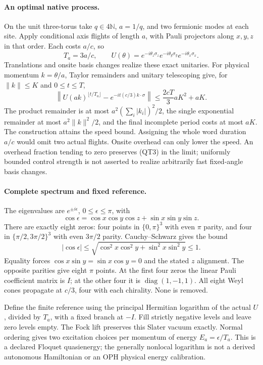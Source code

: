 \paragraph{An optimal native process.}
On the unit three-torus take $q\in4\mathbb N$, $a=1/q$, and two fermionic
modes at each site. Apply conditional axis flights of length $a$, with
Pauli projectors along $x,y,z$ in that order. Each costs $a/c$, so
\[
 T_a=3a/c,\qquad
 U(\theta)=e^{-i\theta_z\sigma_z}e^{-i\theta_y\sigma_y}
               e^{-i\theta_x\sigma_x}.
 \tag{QT2}
\]
Translations and onsite basis changes realize these exact unitaries.
For physical momentum $k=\theta/a$, Taylor remainders and unitary
telescoping give, for $\|k\|\leq K$ and $0\leq t\leq T$,
\[
 \left\|U(ak)^{\lfloor t/T_a\rfloor}
       -e^{-it(c/3)k\cdot\sigma}\right\|
 \leq \frac{2cT}{3}aK^2+aK.
 \tag{QT3}
\]
The product remainder is at most $a^2(\sum_i|k_i|)^2/2$, the single
exponential remainder at most $a^2\|k\|^2/2$, and the final incomplete
period costs at most $aK$. The construction attains the speed bound.
Assigning the whole word duration $a/c$ would omit two actual flights.
Onsite overhead can only lower the speed. An overhead fraction tending to
zero preserves (QT3) in the limit; uniformly bounded control strength is
not asserted to realize arbitrarily fast fixed-angle basis changes.

\paragraph{Complete spectrum and fixed reference.}
The eigenvalues are $e^{\pm i\epsilon}$, $0\leq\epsilon\leq\pi$, with
\[
 \cos\epsilon=\cos x\cos y\cos z+\sin x\sin y\sin z.
 \tag{QT4}
\]
There are exactly eight zeros: four points in $\{0,\pi\}^3$ with even
$\pi$ parity, and four in $\{\pi/2,3\pi/2\}^3$ with even $3\pi/2$
parity. Cauchy--Schwarz gives the bound
\[
 |\cos\epsilon|\leq\sqrt{\cos^2x\cos^2y+\sin^2x\sin^2y}\leq1.
\]
Equality forces
$\cos x\sin y=\sin x\cos y=0$ and the stated $z$ alignment.
The opposite parities give eight $\pi$ points. At the first four zeros
the linear Pauli coefficient matrix is $I$; at the other four it is
$\operatorname{diag}(1,-1,1)$. All eight Weyl cones propagate at $c/3$,
four with each chirality. None is removed.

Define the finite reference using the principal Hermitian logarithm of the
actual $U$, divided by $T_a$, with a fixed branch at $-I$. Fill strictly
negative levels and leave zero levels empty. The Fock lift preserves this
Slater vacuum exactly. Normal ordering gives two excitation choices per
momentum of energy $E_a=\epsilon/T_a$. This is a declared Floquet
quasienergy; the generally nonlocal logarithm is not a derived autonomous
Hamiltonian or an OPH physical energy calibration.

